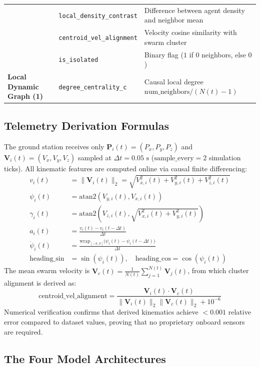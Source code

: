 \documentclass[9pt]{ieeeconf}
\begin{document}
\begin{table}[h]
\begin{tabularx}{\columnwidth}{l l X}
& \texttt{local\_density\_contrast} & Difference between agent density and neighbor mean \\
& \texttt{centroid\_vel\_alignment} & Velocity cosine similarity with swarm cluster \\
& \texttt{is\_isolated} & Binary flag ($1$ if 0 neighbors, else $0$) \\
\midrule
\textbf{Local Dynamic Graph (1)} 
& \texttt{degree\_centrality\_c} & Causal local degree $\text{num\_neighbors} / (N(t) - 1)$ \\
\bottomrule
\end{tabularx}
\end{table}

\subsection{Telemetry Derivation Formulas}
The ground station receives only $\mathbf{P}_i(t) = (P_x, P_y, P_z)$ and $\mathbf{V}_i(t) = (V_x, V_y, V_z)$ sampled at $\Delta t = 0.05\text{ s}$ ($\text{sample\_every} = 2$ simulation ticks). All kinematic features are computed online via causal finite differencing:
\begin{align}
v_i(t) &= \|\mathbf{V}_i(t)\|_2 = \sqrt{V_{x,i}^2(t) + V_{y,i}^2(t) + V_{z,i}^2(t)} \\
\psi_i(t) &= \text{atan2}(V_{y,i}(t), V_{x,i}(t)) \\
\gamma_i(t) &= \text{atan2}\left(V_{z,i}(t), \sqrt{V_{x,i}^2(t) + V_{y,i}^2(t)}\right) \\
a_i(t) &= \frac{v_i(t) - v_i(t - \Delta t)}{\Delta t} \\
\dot{\psi}_i(t) &= \frac{\text{wrap}_{[-\pi, \pi]}\big(\psi_i(t) - \psi_i(t - \Delta t)\big)}{\Delta t} \\
\text{heading\_sin} &= \sin(\psi_i(t)), \quad \text{heading\_cos} = \cos(\psi_i(t))
\end{align}
The mean swarm velocity is $\mathbf{V}_c(t) = \frac{1}{N(t)}\sum_{j=1}^{N(t)}\mathbf{V}_j(t)$, from which cluster alignment is derived as:
\begin{equation}
\text{centroid\_vel\_alignment} = \frac{\mathbf{V}_i(t) \cdot \mathbf{V}_c(t)}{\|\mathbf{V}_i(t)\|_2 \|\mathbf{V}_c(t)\|_2 + 10^{-6}}
\end{equation}
Numerical verification confirms that derived kinematics achieve $<0.001$ relative error compared to dataset values, proving that no proprietary onboard sensors are required.

\subsection{The Four Model Architectures}
\end{document}
